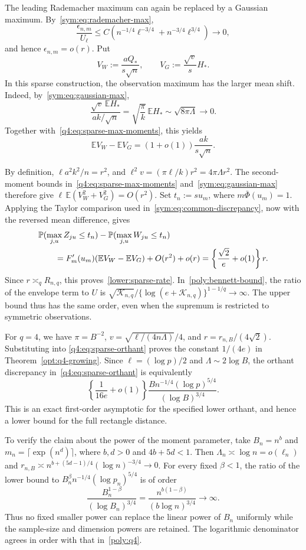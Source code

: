 \documentclass[11pt,letterpaper]{article}
\theoremstyle{remark}
\newcommand{\E}{\mathbb E}
\newcommand{\Pp}{\mathbb P}
\begin{document}
The leading Rademacher maximum can again be replaced by a Gaussian
maximum. By~\eqref{sym:eq:rademacher-max},
\[
 \frac{\epsilon_{n,m}}{U_\ell}
 \le C\left(n^{-1/4}\ell^{-3/4}
                 +n^{-3/4}\ell^{3/4}\right)\longrightarrow0,
\]
and hence \(\epsilon_{n,m}=o(r)\). 
Put
\[
 V_W:=\frac{aQ_*}{s\sqrt n},\qquad V_G:=\frac{\sqrt v}{s}H_*.
\]
In this sparse construction, the observation maximum has the larger
mean shift. Indeed, by~\eqref{sym:eq:gaussian-max},
\[
 \frac{\sqrt v\,\E H_*}{ak/\sqrt n}
 =\sqrt{\frac\pi k}\,\E H_*
 \sim\sqrt{8\pi\Lambda}\longrightarrow0.
\]
Together with~\eqref{q4:eq:sparse-max-moments}, this yields
\begin{equation}
 \E V_W-\E V_G=(1+o(1))\frac{ak}{s\sqrt n}.
 \label{q4:eq:sparse-mean-gap}
\end{equation}

By definition, \(\ell a^2 k^2/n=r^2\), and
\(\ell^2v=(\pi\ell/k)r^2=4\pi\Lambda r^2\).
The second-moment bounds in~\eqref{q4:eq:sparse-max-moments}
and~\eqref{sym:eq:gaussian-max} therefore give
\(\ell\,\E(V_W^2+V_G^2)=O(r^2)\).
Set \(t_n:=su_m\), where
\(m\bar\Phi(u_m)=1\). 
Applying the Taylor comparison used
in~\eqref{sym:eq:common-discrepancy}, now with the reversed
mean difference, gives
\begin{align}
 &\Pp(\max_{j,u}Z_{ju}\le t_n)
       -\Pp(\max_{j,u}W_{ju}\le t_n)\notag\\
 &\qquad
 =F_m'(u_m)(\E V_W-\E V_G)+O(r^2)+o(r)
 =\left\{\frac{\sqrt2}{e}+o(1)\right\}r.
 \label{q4:eq:sparse-orthant}
\end{align}
Since \(r\asymp_q R_{n,q}\), this proves~\eqref{lower:sparse-rate}.
In~\eqref{poly:bennett-bound}, the ratio of the envelope term to \(U\)
is \(\sqrt{\mathcal K_{n,q}}/\{\log(e+\mathcal K_{n,q})\}^{1-1/q}\to\infty\).
The upper bound thus has the same order, even when the supremum is
restricted to symmetric observations.

For \(q=4\), we have \(\pi=B^{-2}\), \(v=\sqrt{\ell/(4n\Lambda)}/4\),
and \(r=r_{n,B}/(4\sqrt2)\). Substituting into
\eqref{q4:eq:sparse-orthant} proves the constant \(1/(4e)\) in
Theorem~\ref{opt:q4-growing}. Since
\(\ell=(\log p)/2\) and \(\Lambda\sim2\log B\), the orthant
discrepancy in~\eqref{q4:eq:sparse-orthant} is equivalently
\[
 \left\{\frac1{16e}+o(1)\right\}
 \frac{B n^{-1/4}(\log p)^{5/4}}{(\log B)^{3/4}}.
\]
This is an exact first-order asymptotic for the specified lower orthant,
and hence a lower bound for the full rectangle distance.

To verify the claim about the power of the moment parameter, take
\(B_n=n^b\) and \(m_n=\lceil\exp(n^d)\rceil\), where
\(b,d>0\) and \(4b+5d<1\). Then
\(\Lambda_n\asymp\log n=o(\ell_n)\) and
\(r_{n,B}\asymp n^{b+(5d-1)/4}(\log n)^{-3/4}\to0\).
For every fixed \(\beta<1\), the ratio of the lower bound to
\(B_n^\beta n^{-1/4}(\log p_n)^{5/4}\) is of order
\[
 \frac{B_n^{1-\beta}}{(\log B_n)^{3/4}}
 =\frac{n^{b(1-\beta)}}{(b\log n)^{3/4}}\longrightarrow\infty.
\]
Thus no fixed smaller power can replace the linear power of \(B_n\)
uniformly while the sample-size and dimension powers are retained.
The logarithmic denominator agrees in order with that in~\eqref{poly:q4}.
\end{document}
